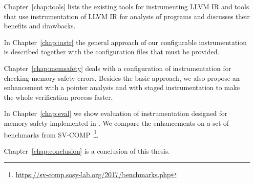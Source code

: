 Chapter~\ref{chap:tools} lists the existing tools for instrumenting LLVM IR and
tools that use instrumentation of LLVM IR for analysis of programs and
discusses their benefits and drawbacks.

In Chapter~\ref{chap:instr} the general approach of our configurable
instrumentation is described together with the configuration files that must
be provided.

Chapter~\ref{chap:memsafety} deals with a configuration of instrumentation for
checking memory safety errors. Besides the basic approach, we also propose an
enhancement with a pointer analysis and with staged instrumentation to make the
whole verification process faster.

In Chapter~\ref{chap:eval} we show evaluation of instrumentation designed for
memory safety implemented in \symbiotic. We compare the enhancements on a
set of benchmarks from
SV-COMP~\footnote{\url{https://sv-comp.sosy-lab.org/2017/benchmarks.php}}.

Chapter~\ref{chap:conclusion} is a conclusion of this thesis.

